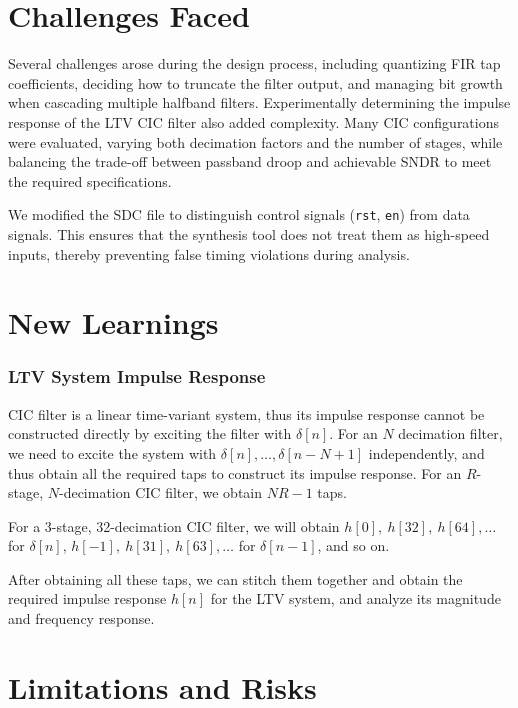 \documentclass[11pt,onecolumn]{IEEEtran}
\begin{document}
\section{Challenges Faced}

Several challenges arose during the design process, including quantizing FIR tap coefficients, deciding how to truncate the filter output, and managing bit growth when cascading multiple halfband filters. Experimentally determining the impulse response of the LTV CIC filter also added complexity. Many CIC configurations were evaluated, varying both decimation factors and the number of stages, while balancing the trade-off between passband droop and achievable SNDR to meet the required specifications.

We modified the SDC file to distinguish control signals (\texttt{rst}, \texttt{en}) from data signals. This ensures that the synthesis tool does not treat them as high-speed inputs, thereby preventing false timing violations during analysis.


\section{New Learnings}

\subsubsection{LTV System Impulse Response}
CIC filter is a linear time-variant system, thus its impulse response cannot be constructed directly by exciting the filter with $\delta[n]$. For an $N$ decimation filter, we need to excite the system with $\delta[n], \ldots, \delta[n-N+1]$ independently, and thus obtain all the required taps to construct its impulse response. For an $R$-stage, $N$-decimation CIC filter, we obtain $NR - 1$ taps.

For a 3-stage, 32-decimation CIC filter, we will obtain $h[0],\ h[32],\ h[64],\ldots$ for $\delta[n]$, $h[-1],\ h[31],\ h[63],\ldots$ for $\delta[n-1]$, and so on.

After obtaining all these taps, we can stitch them together and obtain the required impulse response $h[n]$ for the LTV system, and analyze its magnitude and frequency response.



\section{Limitations and Risks}
\newpage
\end{document}
